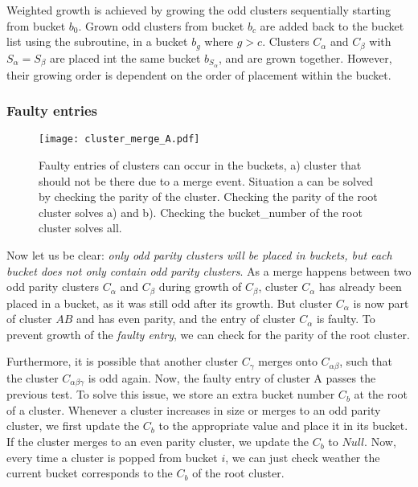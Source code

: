 \begin{theorem}\label{the:bucket_order}
  Weighted growth is achieved by growing the odd clusters sequentially starting from bucket $b_0$. Grown odd clusters from bucket $b_c$ are added back to the bucket list using the  subroutine, in a bucket $b_{g}$ where $g > c$. Clusters $C_\alpha$ and $C_\beta$ with $S_\alpha = S_\beta$ are placed int the same bucket $b_{S_\alpha}$, and are grown together. However, their growing order is dependent on the order of placement within the bucket.
\end{theorem}

\subsubsection{Faulty entries}

\begin{figure}
  \centering
  \texttt{[image: cluster\_merge\_A.pdf]}
  \caption{Faulty entries of clusters can occur in the buckets, a) cluster that should not be there due to a merge event. Situation a can be solved by checking the parity of the cluster. Checking the parity of the root cluster solves a) and b). Checking the bucket\_number of the root cluster solves all.}\label{3.fig.clustermergeB}
\end{figure}

Now let us be clear: \emph{only odd parity clusters will be placed in buckets, but each bucket does not only contain odd parity clusters}. As a merge happens between two odd parity clusters $C_\alpha$ and $C_\beta$ during growth of $C_\beta$, cluster $C_\alpha$ has already been placed in a bucket, as it was still odd after its growth. But cluster $C_\alpha$ is now part of cluster $AB$ and has even parity, and the entry of cluster $C_\alpha$ is faulty. To prevent growth of the \emph{faulty entry}, we can check for the parity of the root cluster.

Furthermore, it is possible that another cluster $C_\gamma$ merges onto $C_{\alpha\beta}$, such that the cluster $C_{\alpha\beta\gamma}$ is odd again. Now, the faulty entry of cluster A passes the previous test. To solve this issue, we store an extra bucket number $C_b$ at the root of a cluster. Whenever a cluster increases in size or merges to an odd parity cluster, we first update the $C_b$ to the appropriate value and place it in its bucket. If the cluster merges to an even parity cluster, we update the $C_b$ to $Null$. Now, every time a cluster is popped from bucket $i$, we can just check weather the current bucket corresponds to the $C_b$ of the root cluster.

